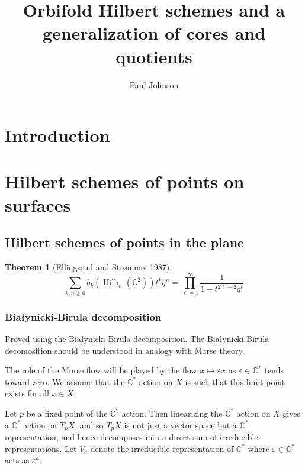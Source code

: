 \documentclass{amsart}[12pt]
\theoremstyle{definition}
\newtheorem{theorem}[dummy]{Theorem}
\newcommand{\C}{\mathbb{C}}
\DeclareMathOperator{\Hilb}{Hilb}
\begin{document}
\title{Orbifold Hilbert schemes and a generalization of cores and quotients}


\author{Paul Johnson}
\address{University of Sheffield}


\maketitle

\section{Introduction}
\cite{GLM}

\section{Hilbert schemes of points on surfaces}

\subsection{Hilbert schemes of points in the plane}


\begin{theorem}[Ellingsrud and Str\o mme, 1987]
$$\sum_{k,n \geq 0} b_k(\Hilb_n(\C^2))t^k q^n=\prod_{\ell=1}^\infty \frac{1}{1-t^{2\ell-2}q^\ell}$$
\end{theorem}



\subsubsection{Bia\l ynicki-Birula decomposition}
Proved using the Bia\l ynicki-Birula decomposition.  The Bia\l ynicki-Birula decomosition should be understood in analogy with Morse theory.  

The role of the Morse flow will be played by the flow $x\mapsto \varepsilon x$ as $\varepsilon\in\C^*$ tends toward zero.  We assume that the $\C^*$ action on $X$ is such that this limit point exists for all $x\in X$.  

Let $p$ be a fixed point of the $\C^*$ action.  Then linearizing the $\C^*$ action on $X$ gives a $\C^*$ action on $T_pX$, and so $T_pX$ is not just a vector space but a $\C^*$ representation, and hence decomposes into a direct sum of irreducible representations.  Let $V_a$ denote the irreducible representation of $\C^*$ where $\varepsilon\in\C^*$ acts as $\varepsilon^a$.  
\end{document}
